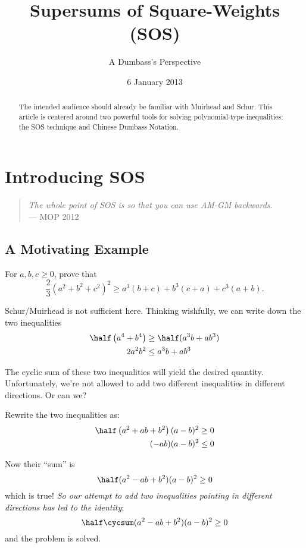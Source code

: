\documentclass{scrartcl}
\begin{document}
\title{Supersums of Square-Weights (SOS)}
\subtitle{A Dumbass's Perspective}
\date{6 January 2013}
\maketitle

\begin{abstract}
  The intended audience should already be familiar with Muirhead and Schur.
  This article is centered around two powerful tools
  for solving polynomial-type inequalities:
  the SOS technique and Chinese Dumbass Notation.
\end{abstract}

\section{Introducing SOS}
\begin{quote}
  \emph{The whole point of SOS is so that you can use AM-GM backwards}. \\
  --- MOP 2012
\end{quote}

\subsection{A Motivating Example}
\begin{example}
  For $a,b,c \ge 0$, prove that \[ \frac{2}{3}(a^2+b^2+c^2)^2 \ge a^3(b+c) + b^3(c+a) + c^3(a+b). \]
\end{example}
\begin{soln}
  Schur/Muirhead is not sufficient here.
  Thinking wishfully, we can write down the two inequalities
  \begin{align*}
    \half \left( a^4+b^4 \right) &\ge \half (a^3b+ab^3) \\
    2a^2b^2 &\le a^3b + ab^3
  \end{align*}

  The cyclic sum of these two inequalities will yield the desired quantity.
  Unfortunately, we're not allowed to add two different inequalities in different directions.
  Or can we?

  Rewrite the two inequalities as:
  \begin{align*}
    \half \left( a^2+ab+b^2 \right)(a-b)^2 &\ge 0 \\
    (-ab)(a-b)^2 &\le 0 \\
  \end{align*}

  Now their ``sum'' is
  \[ \half (a^2-ab+b^2)(a-b)^2 \ge 0 \]
  which is true!
  \emph{So our attempt to add two inequalities pointing in different directions
  has led to the identity}:
  \[ \half \cycsum (a^2-ab+b^2)(a-b)^2 \ge 0 \]
  and the problem is solved.
\end{soln}
\end{document}
